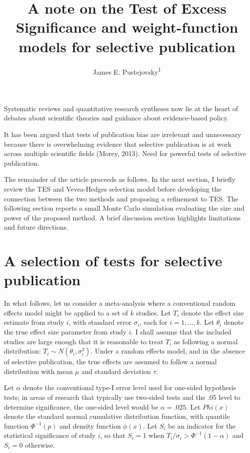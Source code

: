 \documentclass[man,floatsintext]{apa6}
\title{A note on the Test of Excess Significance and weight-function models for selective publication}
\author{James E. Pustejovsky\textsuperscript{1}}
\date{}
\affiliation{
\vspace{0.5cm}
\textsuperscript{1} University of Texas at Austin}
\begin{document}
\maketitle

Systematic reviews and quantitative research syntheses now lie at the heart of debates about scientific theories and guidance about evidence-based policy.

It has been argued that tests of publication bias are irrelevant and unnecessary because there is overwhelming evidence that selective publication is at work across multiple scientific fields (Morey, 2013).
Need for powerful tests of selective publication.

The remainder of the article proceeds as follows.
In the next section, I briefly review the TES and Vevea-Hedges selection model before developing the connection between the two methods and proposing a refinement to TES.
The following section reports a small Monte Carlo simulation evaluating the size and power of the proposed method.
A brief discussion section highlights limitations and future directions.

\hypertarget{tests}{%
\section{A selection of tests for selective publication}\label{tests}}

In what follows, let us consider a meta-analysis where a conventional random effects model might be applied to a set of \(k\) studies.
Let \(T_i\) denote the effect size estimate from study \(i\), with standard error \(\sigma_i\), each for \(i = 1,...,k\). Let \(\theta_i\) denote the true effect size parameter from study \(i\).
I shall assume that the included studies are large enough that it is reasonable to treat \(T_i\) as following a normal distribution: \(T_i \sim N(\theta_i, \sigma_i^2)\).
Under a random effects model, and in the absence of selective publication, the true effects are assumed to follow a normal distribution with mean \(\mu\) and standard deviation \(\tau\).

Let \(\alpha\) denote the conventional type-I error level used for one-sided hypothesis tests; in areas of research that typically use two-sided tests and the .05 level to determine significance, the one-sided level would be \(\alpha = .025\).
Let \(Phi(x)\) denote the standard normal cumulative distribution function, with quantile function \(\Phi^{-1}(p)\) and density function \(\phi(x)\).
Let \(S_i\) be an indicator for the statistical significance of study \(i\), so that \(S_i = 1\) when \(T_i / \sigma_i > \Phi^{-1}(1 - \alpha)\) and \(S_i = 0\) otherwise.
\end{document}
